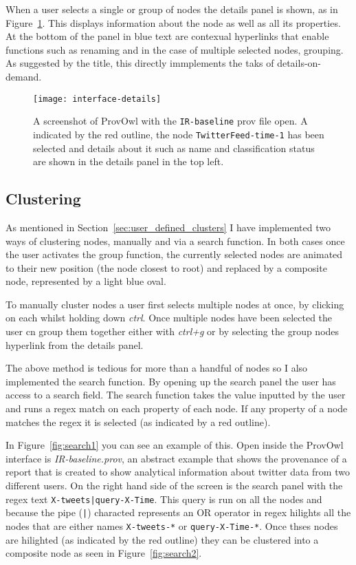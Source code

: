 When a user selects a single or group of nodes the details panel is shown, as in Figure~\ref{fig:interface-details}. This displays information about the node as well as all its properties. At the bottom of the panel in blue text are contexual hyperlinks that enable functions such as renaming and in the case of multiple selected nodes, grouping. As suggested by the title, this directly immplements the taks of details-on-demand.

\begin{figure}[h]
	\centering
	\texttt{[image: interface-details]}
	\caption{A screenshot of ProvOwl with the \texttt{IR-baseline} prov file open. A indicated by the red outline, the node \texttt{TwitterFeed-time-1} has been selected and details about it such as name and classification status are shown in the details panel in the top left.}
	\label{fig:interface-details}
\end{figure}

\subsection{Clustering}
\label{sec:clustering}

As mentioned in Section~\ref{sec:user_defined_clusters} I have implemented two ways of clustering nodes, manually and via a search function. In both cases once the user activates the group function, the currently selected nodes are animated to their new position (the node closest to root) and replaced by a composite node, represented by a light blue oval. 

To manually cluster nodes a user first selects multiple nodes at once, by clicking on each whilst holding down \textit{ctrl}. Once multiple nodes have been selected the user cn group them together either with \textit{ctrl+g} or by selecting the group nodes hyperlink from the details panel.

The above method is tedious for more than a handful of nodes so I also implemented the search function. By opening up the search panel the user has access to a search field. The search function takes the value inputted by the user and runs a regex match on each property of each node. If any property of a node matches the regex it is selected (as indicated by a red outline).

In Figure~\ref{fig:search1} you can see an example of this. Open inside the ProvOwl interface is \textit{IR-baseline.prov}, an abstract example that shows the provenance of a report that is created to show analytical information about twitter data from two different users. On the right hand side of the screen is the search panel with the regex text \texttt{X-tweets|query-X-Time}. This query is run on all the nodes and because the pipe (\texttt{|}) characted represents an OR operator in regex hilights all the nodes that are either names \texttt{X-tweets-*} or \texttt{query-X-Time-*}. Once thses nodes are hilighted (as indicated by the red outline) they can be clustered into a composite node as seen in Figure~\ref{fig:search2}.


